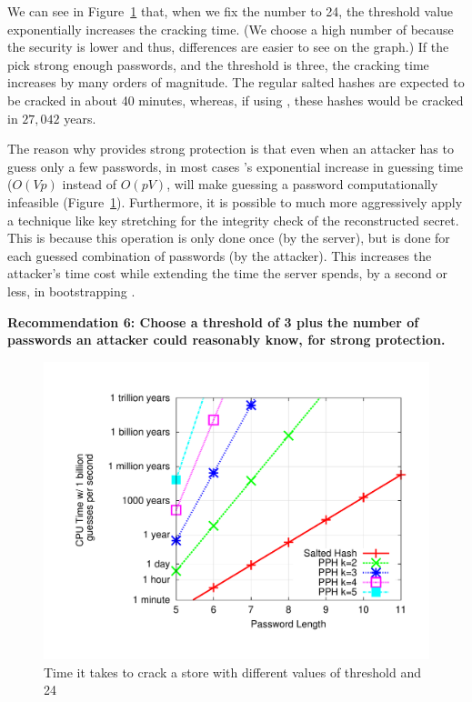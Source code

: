 We can see in Figure~\ref{FIGURE:cracking-threshold} that, when we fix the
\partialbytes number to 24, the threshold value exponentially increases the cracking time. 
(We choose a high number of \partialbytes because the
security is lower and thus, differences are easier to see on the graph.)
If the \thresholdaccounts pick strong enough passwords, and the 
threshold is three, the cracking time increases by many orders of magnitude.
The regular salted hashes are expected to be cracked in about 40 minutes,
whereas, if using \PPH, these hashes would be cracked in $27,042$ years.

The reason why \PPH provides strong protection is that
even when an attacker has to guess only a few passwords, in most cases \PPH's
exponential increase in guessing time ($O(Vp)$ instead of $O(pV)$, will make
guessing a password computationally infeasible
(Figure~\ref{FIGURE:cracking-threshold}). 
Furthermore, it is possible to much more aggressively apply a technique like 
key stretching for the integrity check of the reconstructed secret.  This is
because this operation is only done once (by the server), but is done for
each guessed combination of passwords (by the attacker).  This increases
the attacker's time cost while extending the time the server spends, by a second or less, in 
bootstrapping .

%

{\bf Recommendation 6: Choose a threshold of 3 plus the number of 
\thresholdaccount passwords an attacker could reasonably know, for strong 
protection.}



\begin{figure}
    \centering
    \includegraphics[width=.5\linewidth, trim=195 55 165 55]{./images/plotcrack_threshold}
    \caption{{\small Time it takes to crack a \PPH store with different values of 
    threshold and 24 \partialbytes}}
    \label{FIGURE:cracking-threshold}
\end{figure}

